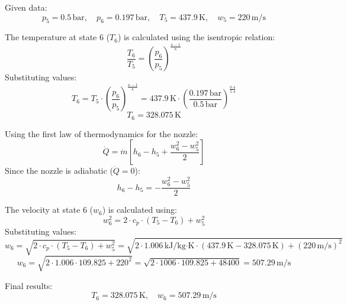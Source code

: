 Given data:  
\[
p_5 = 0.5 \, \text{bar}, \quad p_6 = 0.197 \, \text{bar}, \quad T_5 = 437.9 \, \text{K}, \quad w_5 = 220 \, \text{m/s}
\]  

The temperature at state 6 (\( T_6 \)) is calculated using the isentropic relation:  
\[
\frac{T_6}{T_5} = \left( \frac{p_6}{p_5} \right)^{\frac{\kappa - 1}{\kappa}}  
\]  
Substituting values:  
\[
T_6 = T_5 \cdot \left( \frac{p_6}{p_5} \right)^{\frac{\kappa - 1}{\kappa}} = 437.9 \, \text{K} \cdot \left( \frac{0.197 \, \text{bar}}{0.5 \, \text{bar}} \right)^{\frac{0.4}{1.4}}  
\]  
\[
T_6 = 328.075 \, \text{K}  
\]  

Using the first law of thermodynamics for the nozzle:  
\[
\dot{Q} = \dot{m} \left[ h_6 - h_5 + \frac{w_6^2 - w_5^2}{2} \right]  
\]  
Since the nozzle is adiabatic (\( \dot{Q} = 0 \)):  
\[
h_6 - h_5 = -\frac{w_6^2 - w_5^2}{2}  
\]  

The velocity at state 6 (\( w_6 \)) is calculated using:  
\[
w_6^2 = 2 \cdot c_p \cdot (T_5 - T_6) + w_5^2  
\]  
Substituting values:  
\[
w_6 = \sqrt{2 \cdot c_p \cdot (T_5 - T_6) + w_5^2} = \sqrt{2 \cdot 1.006 \, \text{kJ}/\text{kg·K} \cdot (437.9 \, \text{K} - 328.075 \, \text{K}) + (220 \, \text{m/s})^2}  
\]  
\[
w_6 = \sqrt{2 \cdot 1.006 \cdot 109.825 + 220^2} = \sqrt{2 \cdot 1006 \cdot 109.825 + 48400} = 507.29 \, \text{m/s}  
\]  

Final results:  
\[
T_6 = 328.075 \, \text{K}, \quad w_6 = 507.29 \, \text{m/s}  
\]